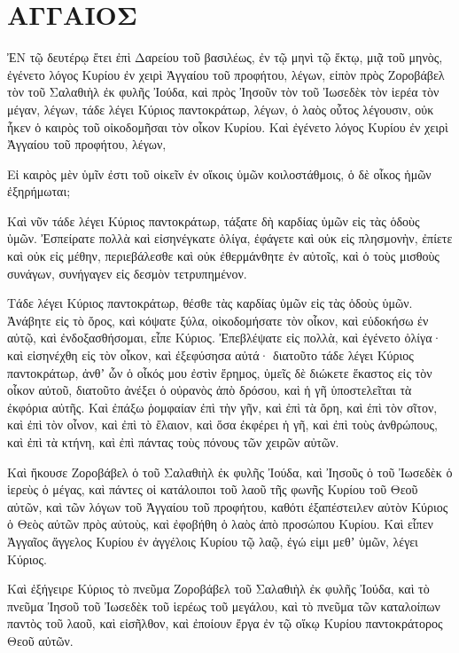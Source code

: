 \begin{spacing}{1.1}
\begin{multicols}{2}
\end{multicols}
\chapter{ΑΓΓΑΙΟΣ}
\begin{multicols}{2}

ἘΝ τῷ δευτέρῳ ἔτει ἐπὶ Δαρείου τοῦ βασιλέως, ἐν τῷ μηνὶ τῷ ἕκτῳ, μιᾷ τοῦ μηνὸς, ἐγένετο λόγος Κυρίου ἐν χειρὶ Ἀγγαίου τοῦ προφήτου, λέγων, εἰπὸν πρὸς Ζοροβάβελ τὸν τοῦ Σαλαθιὴλ ἐκ φυλῆς Ἰούδα, καὶ πρὸς Ἰησοῦν τὸν τοῦ Ἰωσεδὲκ τὸν ἱερέα τὸν μέγαν, λέγων,
τάδε λέγει Κύριος παντοκράτωρ, λέγων, ὁ λαὸς οὗτος λέγουσιν, οὐκ ἧκεν ὁ καιρὸς τοῦ οἰκοδομῆσαι τὸν οἶκον Κυρίου.
Καὶ ἐγένετο λόγος Κυρίου ἐν χειρὶ Ἀγγαίου τοῦ προφήτου, λέγων,

Εἰ καιρὸς μὲν ὑμῖν ἐστι τοῦ οἰκεῖν ἐν οἴκοις ὑμῶν κοιλοστάθμοις, ὁ δὲ οἶκος ἡμῶν ἐξηρήμωται;

Καὶ νῦν τάδε λέγει Κύριος παντοκράτωρ, τάξατε δὴ καρδίας ὑμῶν εἰς τὰς ὁδοὺς ὑμῶν.
Ἐσπείρατε πολλὰ καὶ εἰσηνέγκατε ὀλίγα, ἐφάγετε καὶ οὐκ εἰς πλησμονὴν, ἐπίετε καὶ οὐκ εἰς μέθην, περιεβάλεσθε καὶ οὐκ ἐθερμάνθητε ἐν αὐτοῖς, καὶ ὁ τοὺς μισθοὺς συνάγων, συνήγαγεν εἰς δεσμὸν τετρυπημένον.

Τάδε λέγει Κύριος παντοκράτωρ, θέσθε τὰς καρδίας ὑμῶν εἰς τὰς ὁδοὺς ὑμῶν.
Ἀνάβητε εἰς τὸ ὄρος, καὶ κόψατε ξύλα, οἰκοδομήσατε τὸν οἶκον, καὶ εὐδοκήσω ἐν αὐτῷ, καὶ ἐνδοξασθήσομαι, εἶπε Κύριος.
Ἐπεβλέψατε εἰς πολλὰ, καὶ ἐγένετο ὀλίγα· καὶ εἰσηνέχθη εἰς τὸν οἶκον, καὶ ἐξεφύσησα αὐτά· διατοῦτο τάδε λέγει Κύριος παντοκράτωρ, ἀνθʼ ὧν ὁ οἶκός μου ἐστὶν ἔρημος, ὑμεῖς δὲ διώκετε ἕκαστος εἰς τὸν οἶκον αὐτοῦ,
διατοῦτο ἀνέξει ὁ οὐρανὸς ἀπὸ δρόσου, καὶ ἡ γῆ ὑποστελεῖται τὰ ἐκφόρια αὐτῆς.
Καὶ ἐπάξω ῥομφαίαν ἐπὶ τὴν γῆν, καὶ ἐπὶ τὰ ὄρη, καὶ ἐπὶ τὸν σῖτον, καὶ ἐπὶ τὸν οἶνον, καὶ ἐπὶ τὸ ἔλαιον, καὶ ὅσα ἐκφέρει ἡ γῆ, καὶ ἐπὶ τοὺς ἀνθρώπους, καὶ ἐπὶ τὰ κτήνη, καὶ ἐπὶ πάντας τοὺς πόνους τῶν χειρῶν αὐτῶν.

Καὶ ἤκουσε Ζοροβάβελ ὁ τοῦ Σαλαθιὴλ ἐκ φυλῆς Ἰούδα, καὶ Ἰησοῦς ὁ τοῦ Ἰωσεδὲκ ὁ ἱερεὺς ὁ μέγας, καὶ πάντες οἱ κατάλοιποι τοῦ λαοῦ τῆς φωνῆς Κυρίου τοῦ Θεοῦ αὐτῶν, καὶ τῶν λόγων τοῦ Ἀγγαίου τοῦ προφήτου, καθότι ἐξαπέστειλεν αὐτὸν Κύριος ὁ Θεὸς αὐτῶν πρὸς αὐτοὺς, καὶ ἐφοβήθη ὁ λαὸς ἀπὸ προσώπου Κυρίου.
Καὶ εἶπεν Ἀγγαῖος ἄγγελος Κυρίου ἐν ἀγγέλοις Κυρίου τῷ λαῷ, ἐγώ εἰμι μεθʼ ὑμῶν, λέγει Κύριος.

Καὶ ἐξήγειρε Κύριος τὸ πνεῦμα Ζοροβάβελ τοῦ Σαλαθιὴλ ἐκ φυλῆς Ἰούδα, καὶ τὸ πνεῦμα Ἰησοῦ τοῦ Ἰωσεδὲκ τοῦ ἱερέως τοῦ μεγάλου, καὶ τὸ πνεῦμα τῶν καταλοίπων παντὸς τοῦ λαοῦ, καὶ εἰσῆλθον, καὶ ἐποίουν ἔργα ἐν τῷ οἴκῳ Κυρίου παντοκράτορος Θεοῦ αὐτῶν.


\end{multicols}
\end{spacing}
